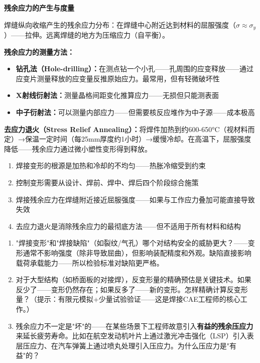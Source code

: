 \documentclass[a4paper,11pt]{ctexbook}
\newenvironment{quantitative}{\vspace{0.3cm}\noindent\begin{tcolorbox}[colback=quant!5!white,colframe=quant!60!black,title=\textcolor{quant}{\textbf{定量分析}}]\vspace{0.1cm}}{\end{tcolorbox}\vspace{0.3cm}}
\newenvironment{lessonsummary}{\vspace{0.3cm}\noindent\begin{tcolorbox}[colback=summarybg,colframe=green!50!black,title=\textbf{总结}]\vspace{0.1cm}}{\end{tcolorbox}\vspace{0.3cm}}
\newenvironment{discuss}{\vspace{0.3cm}\noindent\begin{tcolorbox}[colback=discussbg,colframe=orange!60!black,title=\textbf{讨论题}]\vspace{0.1cm}}{\end{tcolorbox}\vspace{0.3cm}}
\begin{document}
\begin{quantitative}
\textbf{残余应力的产生与度量}

焊缝纵向收缩产生的残余应力分布：在焊缝中心附近达到材料的屈服强度（$\sigma \approx \sigma_y$）——拉伸。远离焊缝的地方为压缩应力（自平衡）。

\textbf{残余应力的测量方法：}
\begin{itemize}
  \item \textbf{钻孔法（Hole-drilling）：}在测点钻一个小孔——孔周围的应变释放——通过应变片测量释放的应变量反推原始应力。最常用，但有轻微破坏性
  \item \textbf{X射线衍射法：}测量晶格间距变化推算应力——无损但只能测表面
  \item \textbf{中子衍射法：}可以测量内部应力——但需要核反应堆作为中子源——成本极高
\end{itemize}

\textbf{去应力退火（Stress Relief Annealing）：}将焊件加热到约600-650°C（视材料而定）→保温一定时间（每25mm厚度约1小时）→缓慢冷却。在高温下，屈服强度降低——残余应力通过微小塑性变形得到释放。
\end{quantitative}

\begin{lessonsummary}
\begin{enumerate}
  \item 焊接变形的根源是加热和冷却的不均匀——热胀冷缩受到约束
  \item 控制变形需要从设计、焊前、焊中、焊后四个阶段综合施策
  \item 焊接残余应力在焊缝附近接近屈服强度——如果与工作应力叠加可能直接导致失效
  \item 去应力退火是消除残余应力的最彻底方法——但不适用于所有材料和结构
\end{enumerate}
\end{lessonsummary}

\begin{discuss}
\begin{enumerate}
  \item "焊接变形"和"焊接缺陷"（如裂纹/气孔）哪个对结构安全的威胁更大？——变形通常不影响强度（除非导致屈曲），但影响装配精度和外观。缺陷直接影响载荷承载能力——所以检验标准对缺陷更严格。
  \item 对于大型结构（如桥面板的对接焊），反变形量的精确预估是关键技术。如果反少了——变形仍然存在；如果反多了——新的变形。怎样精确计算反变形量？（提示：有限元模拟+少量试验验证——这是焊接CAE工程师的核心工作。）
  \item 残余应力不一定是"坏"的——在某些场景下工程师故意引入\textbf{有益的残余压应力}来延长疲劳寿命。比如在航空发动机叶片上通过激光冲击强化（LSP）引入表层压应力、在汽车弹簧上通过喷丸处理引入压应力。为什么压应力是"有益"的？
\end{enumerate}
\end{discuss}
\end{document}
